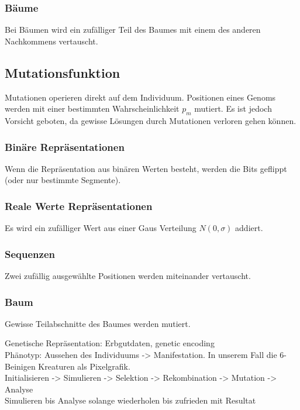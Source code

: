         \subsubsection{Bäume}

          Bei Bäumen wird ein zufälliger Teil des Baumes mit einem des anderen Nachkommens vertauscht.

    \subsection{Mutationsfunktion}

      Mutationen operieren direkt auf dem Individuum.
      Positionen eines Genoms werden mit einer bestimmten Wahrscheinlichkeit \(p_{m}\) mutiert.
      Es ist jedoch Vorsicht geboten, da gewisse Lösungen durch Mutationen verloren gehen können.

      \subsubsection{Binäre Repräsentationen}

        Wenn die Repräsentation aus binären Werten besteht, werden die Bits geflippt (oder nur bestimmte Segmente).

      \subsubsection{Reale Werte Repräsentationen}

        Es wird ein zufälliger Wert aus einer Gaus Verteilung \(N(0,\sigma)\) addiert.

      \subsubsection{Sequenzen}

        Zwei zufällig ausgewählte Positionen werden miteinander vertauscht.

      \subsubsection{Baum}

        Gewisse Teilabschnitte des Baumes werden mutiert.

    Genetische Repräsentation: Erbgutdaten, genetic encoding
    \\
    Phänotyp: Aussehen des Individuums -> Manifestation. In unserem Fall die 6-Beinigen Kreaturen als Pixelgrafik.
    \\
    Initialisieren -> Simulieren -> Selektion -> Rekombination -> Mutation -> Analyse
    \\
    Simulieren bis Analyse solange wiederholen bis zufrieden mit Resultat

